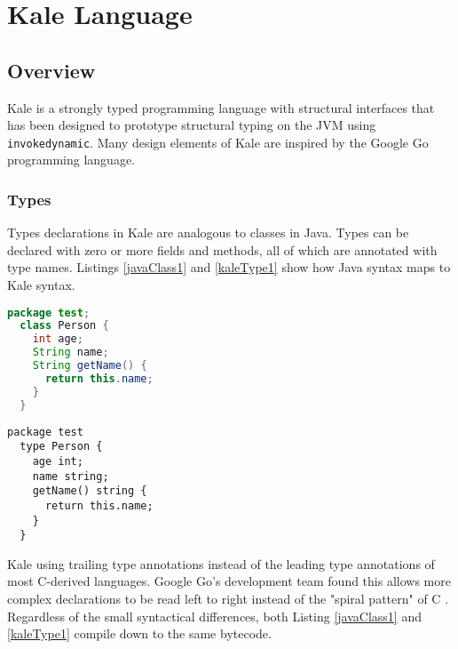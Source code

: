 \chapter{Kale Language}
\label{chapter:Kale}
\lhead{ \leftmark }

\section{Overview}

Kale is a strongly typed programming language with structural interfaces that has been designed to prototype structural typing on the JVM using \texttt{invokedynamic}.  Many design elements of Kale are inspired by the Google Go \cite{golang-spec} programming language.

\subsection{Types}

Types declarations in Kale are analogous to classes in Java.  Types can be declared with zero or more fields and methods, all of which are annotated with type names.  Listings \ref{javaClass1} and \ref{kaleType1} show how Java syntax maps to Kale syntax.

\begin{minipage}[t]{0.45\textwidth}
\begin{lstlisting}[language=Java,caption=A Java code example,label=javaClass1]
  package test;
  class Person {
    int age;
    String name;
    String getName() {
      return this.name;
    }
  }
\end{lstlisting}
\end{minipage}
\hspace{0.5cm}
\begin{minipage}[t]{0.45\textwidth}
\begin{lstlisting}[language=Kale,caption=A Kale code example,label=kaleType1]
  package test
  type Person {
    age int;
    name string;
    getName() string {
      return this.name;
    }
  }
\end{lstlisting}
\end{minipage}

Kale using trailing type annotations instead of the leading type annotations of most C-derived languages.  Google Go's development team found this allows more complex declarations to be read left to right \cite{golang-decl-syntax} instead of the "spiral pattern" of C \cite{c-spiral-decl}.  Regardless of the small syntactical differences, both Listing \ref{javaClass1} and \ref{kaleType1} compile down to the same bytecode.

